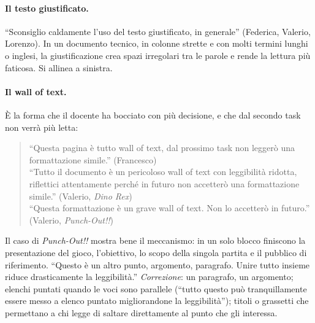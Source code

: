 \paragraph{Il testo giustificato.} ``Sconsiglio caldamente l'uso del testo
giustificato, in generale'' (Federica, Valerio, Lorenzo). In un documento
tecnico, in colonne strette e con molti termini lunghi o inglesi, la
giustificazione crea spazi irregolari tra le parole e rende la lettura più
faticosa. Si allinea a sinistra.

\paragraph{Il wall of text.} È la forma che il docente ha bocciato con più
decisione, e che dal secondo task non verrà più letta:
\begin{quote}
  ``Questa pagina è tutto wall of text, dal prossimo task non leggerò una
  formattazione simile.'' (Francesco)\\
  ``Tutto il documento è un pericoloso wall of text con leggibilità ridotta,
  riflettici attentamente perché in futuro non accetterò una formattazione
  simile.'' (Valerio, \emph{Dino Rex})\\
  ``Questa formattazione è un grave wall of text. Non lo accetterò in
  futuro.'' (Valerio, \emph{Punch-Out!!})
\end{quote}
Il caso di \emph{Punch-Out!!} mostra bene il meccanismo: in un solo blocco
finiscono la presentazione del gioco, l'obiettivo, lo scopo della singola
partita e il pubblico di riferimento. ``Questo è un altro punto, argomento,
paragrafo. Unire tutto insieme riduce drasticamente la leggibilità.''
\emph{Correzione}: un paragrafo, un argomento; elenchi puntati quando le voci
sono parallele (``tutto questo può tranquillamente essere messo a elenco
puntato migliorandone la leggibilità''); titoli o grassetti che permettano a
chi legge di saltare direttamente al punto che gli interessa.

